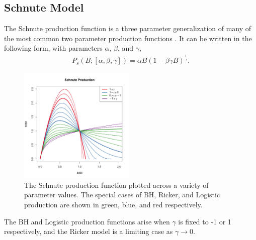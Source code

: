 \documentclass[12pt]{article}
\begin{document}
%
\subsection{Schnute Model}

%
The Schnute production function is a three parameter generalization of many of 
the most common two parameter production functions . %
It can be written in the following form, with parameters $\alpha$, $\beta$, and $\gamma$,
%
\begin{align}
P_s(B; [\alpha, \beta, \gamma]) = \alpha B (1-\beta\gamma B)^{\frac{1}{\gamma}}.
\end{align}

%
\begin{figure}
\includegraphics[width=0.49\textwidth]{../gpBias/g3.png}
\vspace{-1cm}
\caption{
The Schnute production function plotted across a variety of parameter
values. The special cases of BH, Ricker, and Logistic production are shown in
green, blue, and red respectively.
}
\label{sRegimes}
\end{figure}

%
The BH and Logistic production functions arise when $\gamma$ is fixed to -1 or 
1 respectively, and the Ricker model is a limiting case as $\gamma\rightarrow0$. %
\end{document}
